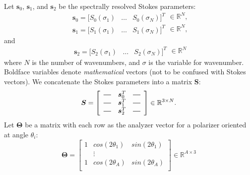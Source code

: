 \documentclass[10pt]{article}
\numberwithin{equation}{subsection}
\newcommand{\lbf}[1]{\ensuremath{{\boldsymbol #1}}}
\begin{document}
Let $\lbf s_0$, $\lbf s_1$, and $\lbf s_2$ be the spectrally resolved Stokes parameters:
    \begin{equation}
        \begin{array}{cccc}
            \lbf s_0 = \bigl[S_0(\sigma_1) & \ldots & S_0(\sigma_N)\bigr]^T
        \end{array} \in \mathbb R^{N},
        \label{s0def}
    \end{equation}
    \begin{equation}
        \begin{array}{cccc}
            \lbf s_1 = \bigl[S_1(\sigma_1) & \ldots & S_1(\sigma_N)\bigr]^T
        \end{array} \in \mathbb R^{N},
        \label{s1def}
    \end{equation}
and
    \begin{equation}
        \begin{array}{cccc}
            \lbf s_2 = \bigl[S_2(\sigma_1) & \ldots & S_2(\sigma_N)\bigr]^T
        \end{array} \in \mathbb R^{N}
        \label{s2def}
    \end{equation}
where $N$ is the number of wavenumbers, and $\sigma$ is the variable for wavenumber.
Boldface variables denote \emph{mathematical} vectors (not to be confused with Stokes vectors).
We concatenate the Stokes parameters into a matrix $\lbf S$:
    \begingroup
    \renewcommand*{\arraystretch}{1.5}
    \begin{equation}
        \lbf S = \left[ \begin{array}{ccc}
            \horzbar & \lbf s_0^T & \horzbar \\
            \horzbar & \lbf s_1^T & \horzbar \\
            \horzbar & \lbf s_2^T & \horzbar \\
        \end{array} \right] \in \mathbb R^{3 \times N}.
    \end{equation}
    \endgroup
Let $\lbf \Theta$ be a matrix with each row as the analyzer vector for a polarizer oriented at angle $\theta_i$:
    \begin{equation}
        \lbf \Theta = \left[ \begin{array}{ccc}
            1 & cos(2 \theta_1) & sin(2 \theta_1) \\
              & \vdots & \\
            1 & cos(2 \theta_A) & sin(2 \theta_A) \\
        \end{array} \right] \in \mathbb R^{A \times 3}
    \end{equation}
\end{document}
